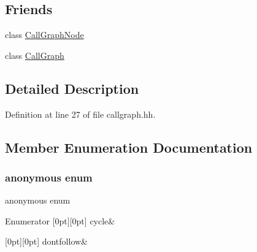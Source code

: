 \subsection*{Friends}
\begin{DoxyCompactItemize}
\item 
class \mbox{\hyperlink{class_call_graph_edge_ad87c9cd7af608d084b270c20d3e291c7}{Call\+Graph\+Node}}
\item 
class \mbox{\hyperlink{class_call_graph_edge_a05afb094c2637ded1f1b905b70d198a9}{Call\+Graph}}
\end{DoxyCompactItemize}


\subsection{Detailed Description}


Definition at line 27 of file callgraph.\+hh.



\subsection{Member Enumeration Documentation}
\mbox{\label{class_call_graph_edge_ae0c626c4a0f80a97f33acf82cc6462b7}} 
\subsubsection{\texorpdfstring{anonymous enum}{anonymous enum}}
{\footnotesize\ttfamily anonymous enum}

\begin{DoxyEnumFields}{Enumerator}
[0pt][0pt]{}\mbox{\label{class_call_graph_edge_ae0c626c4a0f80a97f33acf82cc6462b7aff8d8d4892536224bd984531ddc12a92}} 
cycle&\\
\hline

[0pt][0pt]{}\mbox{\label{class_call_graph_edge_ae0c626c4a0f80a97f33acf82cc6462b7afee733c96c0a8debd4dbf994feaa10c7}} 
dontfollow&\\
\hline

\end{DoxyEnumFields}


